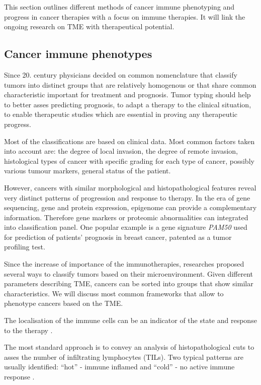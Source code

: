 \documentclass[12pt,]{book}
\theoremstyle{definition}
\theoremstyle{definition}
\theoremstyle{definition}
\theoremstyle{remark}
\begin{document}
This section outlines different methods of cancer immune phenotyping and
progress in cancer therapies with a focus on immune therapies. It will
link the ongoing research on TME with therapeutical potential.

\hypertarget{cancer-immune-phenotypes}{%
\subsection{Cancer immune phenotypes}\label{cancer-immune-phenotypes}}

Since 20. century physicians decided on common nomenclature that
classify tumors into distinct groups that are relatively homogenous or
that share common characteristic important for treatment and prognosis.
Tumor typing should help to better asses predicting prognosis, to adapt
a therapy to the clinical situation, to enable therapeutic studies which
are essential in proving any therapeutic progress.

Most of the classifications are based on clinical data. Most common
factors taken into account are: the degree of local invasion, the degree
of remote invasion, histological types of cancer with specific grading
for each type of cancer, possibly various tumour markers, general status
of the patient.

However, cancers with similar morphological and histopathological
features reveal very distinct patterns of progression and response to
therapy. In the era of gene sequencing, gene and protein expression,
epigenome can provide a complementary information. Therefore gene
markers or proteomic abnormalities can integrated into classification
panel. One popular example is a gene signature \emph{PAM50}
\citep{Parker2009} used for prediction of patients' prognosis in breast
cancer, patented as a tumor profiling test.

Since the increase of importance of the immunotherapies, researches
proposed several ways to classify tumors based on their
microenvironment. Given different parameters describing TME, cancers can
be sorted into groups that show similar characteristics. We will discuss
most common frameworks that allow to phenotype cancers based on the TME.

The localisation of the immune cells can be an indicator of the state
and response to the therapy \citep{Bindea2013}.

The most standard approach is to convey an analysis of histopathological
cuts to asses the number of infiltrating lymphocytes (TILs). Two typical
patterns are usually identified: ``hot'' - immune inflamed and ``cold''
- no active immune response \citep{Berghoff2018}.
\end{document}
